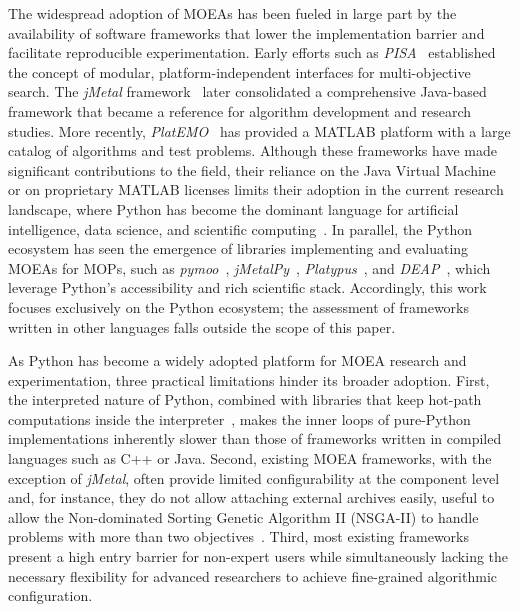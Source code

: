 \documentclass[final,5p,times,twocolumn]{elsarticle}
\begin{document}
The widespread adoption of MOEAs has been fueled in large part by the availability of software frameworks that lower the implementation barrier and facilitate reproducible experimentation. Early efforts such as \textit{PISA}~\cite{BLT+03} established the concept of modular, platform-independent interfaces for multi-objective search. The \textit{jMetal} framework~\cite{DN11} later consolidated a comprehensive Java-based framework that became a reference for algorithm development and research studies. More recently, \textit{PlatEMO}~\cite{TCZ+17} has provided a MATLAB platform with a large catalog of algorithms and test problems. Although these frameworks have made significant contributions to the field, their reliance on the Java Virtual Machine or on proprietary MATLAB licenses limits their adoption in the current research landscape, where Python has become the dominant language for artificial intelligence, data science, and scientific computing~\cite{HMV+20}. In parallel, the Python ecosystem has seen the emergence of libraries implementing and evaluating MOEAs for MOPs, such as \textit{pymoo}~\cite{BD20}, \textit{jMetalPy}~\cite{BNG+19}, \textit{Platypus}~\cite{hadka15}, and \textit{DEAP}~\cite{FDG+12}, which leverage Python's accessibility and rich scientific stack. Accordingly, this work focuses exclusively on the Python ecosystem; the assessment of frameworks written in other languages falls outside the scope of this paper.

As Python has become a widely adopted platform for MOEA research and experimentation, three practical limitations hinder its broader adoption. First, the interpreted nature of Python, combined with libraries that keep hot-path computations inside the interpreter~\cite{BNG+19,FDG+12,hadka15}, makes the inner loops of pure-Python implementations inherently slower than those of frameworks written in compiled languages such as C++ or Java. Second, existing MOEA frameworks, with the exception of \textit{jMetal}, often provide limited configurability at the component level and, for instance, they do not allow attaching external archives easily, useful to allow the Non-dominated Sorting Genetic Algorithm II (NSGA-II) to handle problems with more than two objectives~\cite{IPS20}. Third, most existing frameworks present a high entry barrier for non-expert users while simultaneously lacking the necessary flexibility for advanced researchers to achieve fine-grained algorithmic configuration.
\end{document}
